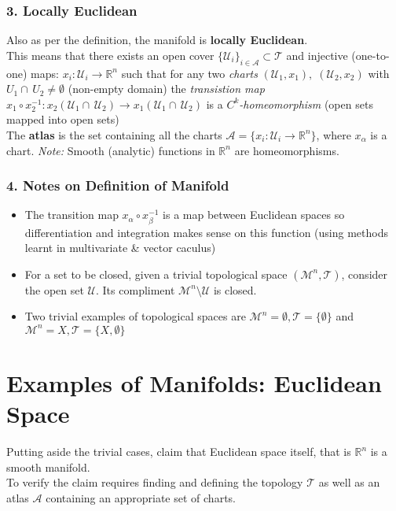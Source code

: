 \documentclass[11pt]{report}
\theoremstyle{thm}
\newcommand{\textem}[1]{\textcolor{mp}{\textbf{#1}}}
\begin{document}
\subsubsection{3. Locally Euclidean}
Also as per the definition, the manifold is \textem{locally Euclidean}.\\[1em] 
This means that there exists an open 
cover $\{\mathcal{U}_i\}_{i \in \mathcal{A}} \subset \mathcal{T}$ and injective 
(one-to-one) maps: $x_i: \mathcal{U}_i \rightarrow \mathbb{R}^n$ such 
that for any two \textit{charts} $(\mathcal{U}_1, x_1),\; 
(\mathcal{U}_2, x_2)$ with $U_1 \cap\, U_2 \ne \emptyset$ (non-empty domain) 
the \textit{transistion map} $x_1 \circ x_2^{-1} : 
x_2(\mathcal{U}_1 \cap\, \mathcal{U}_2) \rightarrow 
x_1(\mathcal{U}_1 \cap\, \mathcal{U}_2)$ is a 
\textit{$C^k$-homeomorphism} (open sets mapped into open sets)\\[1em]
The \textem{atlas} is the set containing all the charts 
$\mathcal{A}=\{x_i: \mathcal{U}_i \rightarrow \mathbb{R}^n\}$, where 
$x_\alpha$ is a chart.
\textit{Note:} Smooth (analytic) functions in $\mathbb{R}^n$ are homeomorphisms.
\newpage\noindent \subsubsection{4. Notes on Definition of Manifold}
\begin{itemize}
	\item The transition map $x_\alpha \circ x_\beta^{-1}$ is a map between 
	Euclidean spaces so differentiation and integration makes sense on this 
	function (using methods learnt in multivariate \& vector caculus)
	\item For a set to be closed, given a trivial topological space 
	$(\mathcal{M}^n, \mathcal{T})$, consider the open set $\mathcal{U}$. Its 
	compliment $\mathcal{M}^n \setminus \mathcal{U}$ is closed.
\item Two trivial examples of topological spaces are $\mathcal{M}^n = 
\emptyset, \mathcal{T} = \{\emptyset\}$ and $\mathcal{M}^n = X, \mathcal{T}=\{X,
\emptyset\}$\\
\end{itemize}
\section{Examples of Manifolds: Euclidean Space}
Putting aside the trivial cases, claim that Euclidean space itself, that is 
$\mathbb{R}^n$ is a smooth manifold.\\[1em]
To verify the claim requires finding and defining the topology $\mathcal{T}$ as 
well as an atlas $\mathcal{A}$ containing an appropriate set of charts.
\end{document}
